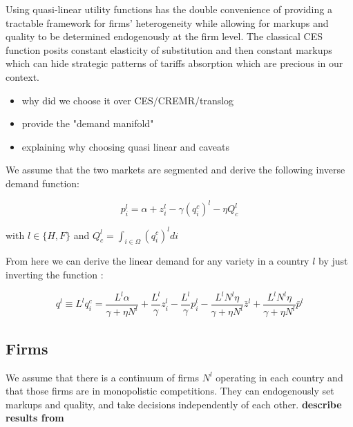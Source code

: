 Using quasi-linear utility functions has the double convenience of providing a tractable framework for firms' heterogeneity while allowing for markups and quality to be determined endogenously at the firm level. The classical CES function posits constant elasticity of substitution and then constant markups which can hide strategic patterns of tariffs absorption which are precious in our context.

\begin{tcolorbox}[title=To Do, colback=white, colframe=orange]
\begin{itemize}
    \item  why did we choose it over CES/CREMR/translog
    \item provide the "demand manifold" \cite{mrazovaNotDemandingDemand2017} 
    \item explaining why choosing quasi linear and caveats \citep{demidovaTradePoliciesFirm2017, bagwellTradePolicyMonopolistic2020}
\end{itemize}
\end{tcolorbox}

We assume that the two markets are segmented and derive the following inverse demand function:

\begin{equation} \label{eq:inverse_demand}
    p_i^l = \alpha + z_i^l - \gamma (q_i^c)^l - \eta Q_c^l
\end{equation}

with $l \in \{H,F\}$ and $Q_c^l = \int_{i \in \Omega} (q_i^c)^l di$

From here we can derive the linear demand for any variety in a country $l$ by just inverting the function : 

\begin{equation} \label{eq:linear_demand}
q^l \equiv L^l q_i^c = \frac{L^l \alpha}{\gamma + \eta N^l} +\frac{L^l}{\gamma} z_i^l - \frac{L^l}{\gamma} p_i^l - \frac{L^l N^l \eta}{\gamma + \eta N^l}\bar{z}^l + \frac{L^l N^l \eta}{\gamma + \eta N^l} \bar{p}^l
\end{equation}

\subsection{Firms}

We assume that there is a continuum of firms $N^l$ operating in each country and that those firms are in monopolistic competitions. They can endogenously set markups and quality, and take decisions independently of each other.
\textbf{describe results from \citet{antoniadesHeterogeneousFirmsQuality2015}}

